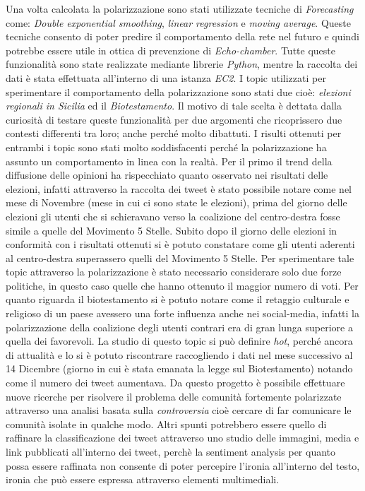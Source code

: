 \begin{spacing}{1.0}
\begin{itemize}
\end{itemize}
Una volta calcolata la polarizzazione sono stati utilizzate tecniche di \textit{Forecasting} come: \textit{Double exponential smoothing}, \textit{linear regression} e \textit{moving average}. Queste tecniche consento di poter predire il comportamento della rete nel futuro e quindi potrebbe essere utile in ottica di prevenzione di \textit{Echo-chamber}. Tutte queste funzionalità sono state realizzate mediante librerie \textit{Python}, mentre la raccolta dei dati è stata effettuata all'interno di una istanza \textit{EC2}.
I topic utilizzati per sperimentare il comportamento della polarizzazione sono stati due cioè: \textit{elezioni regionali in Sicilia} ed il \textit{Biotestamento}. Il motivo di tale scelta è dettata dalla curiosità di testare queste funzionalità per due argomenti che ricoprissero due contesti differenti tra loro; anche perché molto dibattuti. I risulti ottenuti per entrambi i topic sono stati molto soddisfacenti perché la polarizzazione ha assunto un comportamento in linea con la realtà. 
Per il primo il trend della diffusione delle opinioni ha rispecchiato quanto osservato nei risultati delle elezioni, infatti attraverso la raccolta dei tweet è stato possibile notare come nel mese di Novembre (mese in cui ci sono state le elezioni), prima del giorno delle elezioni gli utenti che si schieravano verso la coalizione del centro-destra fosse simile a quelle del Movimento 5 Stelle. Subito dopo il giorno delle elezioni in conformità con i risultati ottenuti si è potuto constatare come gli utenti aderenti al centro-destra superassero quelli del Movimento 5 Stelle. Per sperimentare tale topic attraverso la polarizzazione è stato necessario considerare solo due forze politiche, in questo caso quelle che hanno ottenuto il maggior numero di voti.
Per quanto riguarda il  biotestamento si è potuto notare come il retaggio culturale e religioso di un paese avessero una forte influenza anche nei social-media, infatti la polarizzazione della coalizione degli utenti contrari era di gran lunga superiore a quella dei favorevoli. 
La studio di questo topic si può definire \textit{hot}, perché ancora di attualità e lo si è potuto riscontrare raccogliendo i dati nel mese successivo al 14 Dicembre (giorno in cui è stata emanata la legge sul Biotestamento) notando come il numero dei tweet aumentava.
Da questo progetto è possibile effettuare nuove ricerche per risolvere il problema delle comunità fortemente polarizzate attraverso una analisi basata sulla \textit{controversia} cioè cercare di far comunicare le comunità isolate in qualche modo. Altri spunti potrebbero essere quello di raffinare la classificazione dei tweet attraverso uno studio delle immagini, media e link pubblicati all'interno dei tweet, perchè la sentiment analysis per quanto possa essere raffinata non consente di poter percepire l'ironia all'interno del testo, ironia che può essere espressa attraverso elementi multimediali.
\end{spacing}